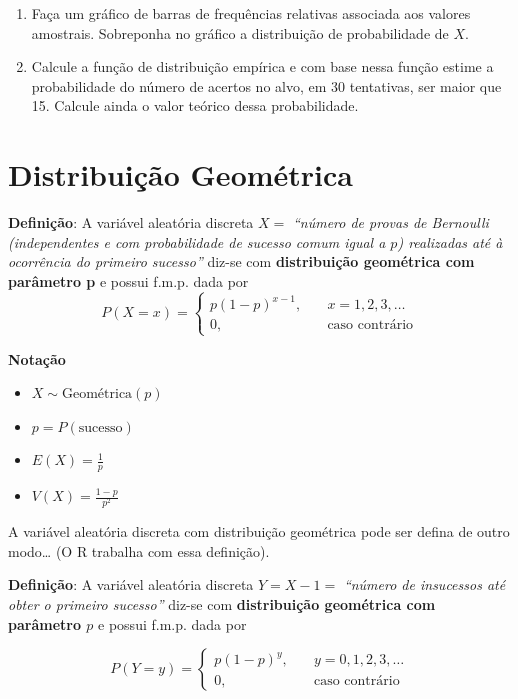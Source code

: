 \documentclass[
]{book}
\providecommand{\tightlist}{%
  \setlength{\itemsep}{0pt}\setlength{\parskip}{0pt}}
\begin{document}
\begin{enumerate}
\def\labelenumi{(\alph{enumi})}
\item
  Faça um gráfico de barras de frequências relativas associada aos valores amostrais. Sobreponha no gráfico a distribuição de probabilidade de \(X\).
\item
  Calcule a função de distribuição empírica e com base nessa
  função estime a probabilidade do número de acertos no alvo, em 30
  tentativas, ser maior que 15. Calcule ainda o valor teórico dessa
  probabilidade.
\end{enumerate}

\section{Distribuição Geométrica}\label{distribuiuxe7uxe3o-geomuxe9trica}

\textbf{Definição}: A variável aleatória discreta \(X=\) \emph{``número de provas de Bernoulli (independentes e com probabilidade de sucesso
comum igual a \(p\)) realizadas até à ocorrência do primeiro sucesso''} diz-se com \textbf{distribuição geométrica com parâmetro p} e possui f.m.p. dada por
\[P(X=x) = \begin{cases}
p(1-p)^{x-1},& \quad x=1,2,3,\ldots \\
0,& \quad \text{caso contrário}
\end{cases}\]

\textbf{Notação}

\begin{itemize}
\tightlist
\item
  \(X \sim \text{Geométrica}(p)\)
\item
  \(p = P(\text{sucesso})\)
\item
  \(E(X) = \frac{1}{p}\)
\item
  \(V(X) = \frac{1-p}{p^2}\)
\end{itemize}

A variável aleatória discreta com distribuição geométrica pode ser defina de outro modo\ldots{} (O R trabalha com essa definição).

\textbf{Definição}: A variável aleatória discreta \(Y= X-1 =\) \emph{``número de insucessos até obter o primeiro sucesso''} diz-se com \textbf{distribuição geométrica com parâmetro \(p\)} e possui f.m.p. dada por

\[P(Y=y) = \begin{cases}
p(1-p)^{y},& \quad y=0,1,2,3,\ldots \\
0,& \quad \text{caso contrário}
\end{cases}\]
\end{document}
